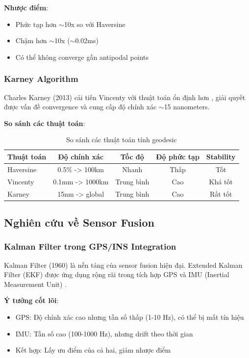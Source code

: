 \textbf{Nhược điểm}:
\begin{itemize}
    \item Phức tạp hơn $\sim$10x so với Haversine
    \item Chậm hơn $\sim$10x ($\sim$0.02ms)
    \item Có thể không converge gần antipodal points
\end{itemize}

\subsubsection{Karney Algorithm}
Charles Karney (2013) cải tiến Vincenty với thuật toán ổn định hơn \cite{karney2013algorithms}, giải quyết được vấn đề convergence và cung cấp độ chính xác $\sim$15 nanometers.

\textbf{So sánh các thuật toán}:
\begin{table}[H]
\centering
\small
\begin{tabular}{|l|c|c|c|c|}
\hline
\textbf{Thuật toán} & \textbf{Độ chính xác} & \textbf{Tốc độ} & \textbf{Độ phức tạp} & \textbf{Stability} \\
\hline
Haversine & 0.5\% -> 100km & Nhanh & Thấp & Tốt \\
\hline
Vincenty & 0.1mm -> 1000km & Trung bình & Cao & Khá tốt \\
\hline
Karney & 15nm -> global & Trung bình & Cao & Rất tốt \\
\hline
\end{tabular}
\caption{So sánh các thuật toán tính geodesic}
\end{table}

\subsection{Nghiên cứu về Sensor Fusion}

\subsubsection{Kalman Filter trong GPS/INS Integration}
Kalman Filter (1960) là nền tảng của sensor fusion hiện đại. Extended Kalman Filter (EKF) được ứng dụng rộng rãi trong tích hợp GPS và IMU (Inertial Measurement Unit) \cite{groves2013principles}.

\textbf{Ý tưởng cốt lõi}:
\begin{itemize}
    \item GPS: Độ chính xác cao nhưng tần số thấp (1-10 Hz), có thể bị mất tín hiệu
    \item IMU: Tần số cao (100-1000 Hz), nhưng drift theo thời gian
    \item Kết hợp: Lấy ưu điểm của cả hai, giảm nhược điểm
\end{itemize}


